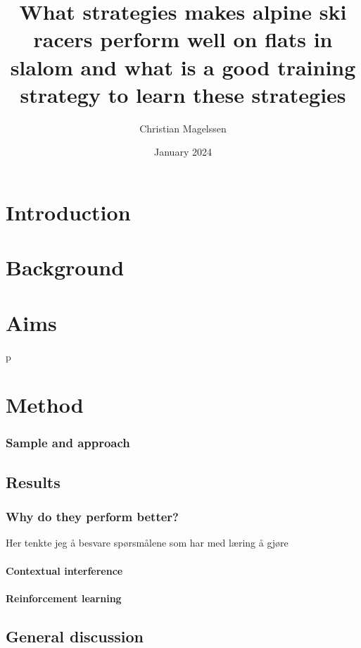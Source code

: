 \documentclass{report}
\title{What strategies makes alpine ski racers perform well on flats in slalom and what is a good training strategy to learn these strategies}
\author{Christian Magelssen}
\date{January 2024}
\begin{document}
\maketitle

\listoffigures

\chapter{Introduction}


\chapter{Background}


\chapter{Aims}



p
\chapter{Method}



\subsection{Sample and approach}


\section{Results}





\subsection{Why do they perform better?}
Her tenkte jeg å besvare spørsmålene som har med læring å gjøre

\subsubsection{Contextual interference}

\subsubsection{Reinforcement learning}







\section{General discussion}


\printbibliography
\end{document}
